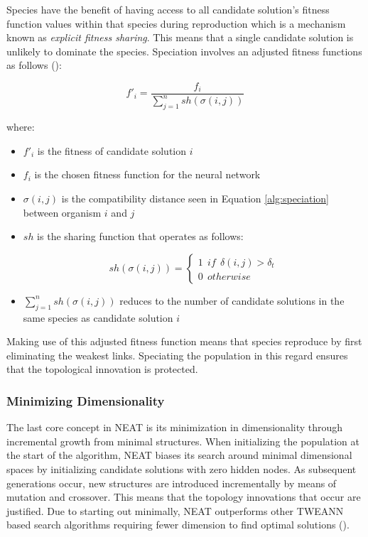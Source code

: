 \noindent Species have the benefit of having access to all candidate solution's fitness function values within that species during reproduction which is a mechanism known as \textit{explicit fitness sharing}. This means that a single candidate solution is unlikely to dominate the species. Speciation involves an adjusted fitness functions as follows (\cite{stanley2002evolving}):

\begin{equation}\label{alg:speciation}
    f'_i = \frac{f_i}{\sum_{j=1}^{n}sh(\sigma(i,j))}
\end{equation}

\noindent where:
\begin{itemize}
    \item $f'_i$ is the fitness of candidate solution $i$
    \item $f_i$ is the chosen fitness function for the neural network
    \item $\sigma(i,j)$ is the compatibility distance seen in Equation \ref{alg:speciation} between organism $i$ and $j$
    \item $sh$ is the sharing function that operates as follows:
    
    \begin{equation}\label{alg:sharing_function}
        sh(\sigma(i,j)) = 
        \begin{cases} 
            1 \:\: if \:\: \delta(i,j) > \delta_t \\
            0 \:\: otherwise
        \end{cases}
    \end{equation}

    \item $\sum_{j=1}^{n}sh(\sigma(i,j))$ reduces to the number of candidate solutions in the same species as candidate solution $i$
\end{itemize}

\noindent Making use of this adjusted fitness function means that species reproduce by first eliminating the weakest links. Speciating the population in this regard ensures that the topological innovation is protected.

\subsubsection{Minimizing Dimensionality}
The last core concept in NEAT is its minimization in dimensionality through incremental growth from minimal structures. When initializing the population at the start of the algorithm, NEAT biases its search around minimal dimensional spaces by initializing candidate solutions with zero hidden nodes. As subsequent generations occur, new structures are introduced incrementally by means of mutation and crossover. This means that the topology innovations that occur are justified. Due to starting out minimally, NEAT outperforms other TWEANN based search algorithms requiring fewer dimension to find optimal solutions (\cite{stanley2002evolving}).

